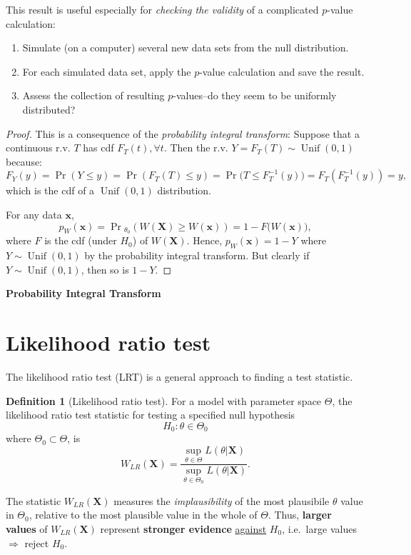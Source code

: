 \documentclass[
]{book}
\providecommand{\tightlist}{%
  \setlength{\itemsep}{0pt}\setlength{\parskip}{0pt}}
\newcommand{\bx}{{\boldsymbol x}}
\newcommand{\bX}{{\boldsymbol X}}
\DeclareMathOperator{\Unif}{Unif}
\theoremstyle{definition}
\newtheorem{definition}{Definition}[chapter]
\theoremstyle{definition}
\theoremstyle{definition}
\theoremstyle{definition}
\theoremstyle{remark}
\begin{document}
This result is useful especially for \emph{checking the validity} of a complicated \(p\)-value calculation:

\begin{enumerate}
\def\labelenumi{\arabic{enumi}.}
\tightlist
\item
  Simulate (on a computer) several new data sets from the null distribution.
\item
  For each simulated data set, apply the \(p\)-value calculation and save the result.
\item
  Assess the collection of resulting \(p\)-values--do they seem to be uniformly distributed?
\end{enumerate}

\begin{proof}
This is a consequence of the \emph{probability integral transform}: Suppose that a continuous r.v. \(T\) has cdf \(F_T(t), \forall t\). Then the r.v. \(Y=F_T(T)\sim\Unif(0,1)\) because:
\[
F_Y(y)=\Pr(Y\leq y) = \Pr(F_T(T)\leq y) = \Pr\big(T \leq F^{-1}_T(y)\big) = F_T\left(F^{-1}_T(y) \right) = y,
\]
which is the cdf of a \(\Unif(0,1)\) distribution.

For any data \(\bx\),
\[
p_W(\bx) =  \Pr\!{}_{\theta_0}\left(W(\bX) \geq W(\bx) \right) = 1 - F\big( W(\bx) \big),
\]
where \(F\) is the cdf (under \(H_0\)) of \(W(\bX)\). Hence, \(p_W(\bx)=1-Y\) where \(Y\sim\Unif(0,1)\) by the probability integral transform. But clearly if \(Y\sim\Unif(0,1)\), then so is \(1-Y\).
\end{proof}

\textbf{Probability Integral Transform}

\hypertarget{likelihood-ratio-test}{%
\section{Likelihood ratio test}\label{likelihood-ratio-test}}

The likelihood ratio test (LRT) is a general approach to finding a test statistic.

\begin{definition}[Likelihood ratio test]
For a model with parameter space \(\Theta\), the likelihood ratio test statistic for testing a specified null hypothesis
\[
H_0: \theta \in \Theta_0
\]
where \(\Theta_0\subset \Theta\), is
\[
W_{LR}(\bX) = \frac{\sup_{\theta\in\Theta} L(\theta|\bX)}{\sup_{\theta\in\Theta_0} L(\theta|\bX)}.
\]
\end{definition}

The statistic \(W_{LR}(\bX)\) measures the \emph{implausibility} of the most plausibile \(\theta\) value in \(\Theta_0\), relative to the most plausible value in the whole of \(\Theta\).
Thus, \textbf{larger values} of \(W_{LR}(\bX)\) represent \textbf{stronger evidence} \underline{against} \(H_0\), i.e.~large values \(\Rightarrow\) reject \(H_0\).
\end{document}

